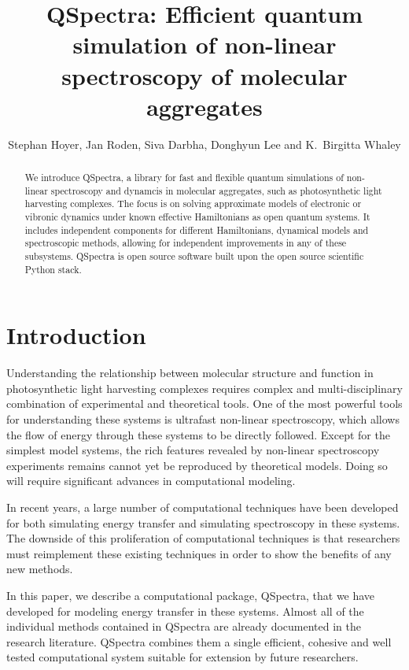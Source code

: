 \documentclass{article}
\begin{document}
\title{QSpectra: Efficient quantum simulation of non-linear spectroscopy of molecular aggregates}
\author{Stephan Hoyer, Jan Roden, Siva Darbha, Donghyun Lee and K.\ Birgitta Whaley}
\maketitle

\begin{abstract}
We introduce QSpectra, a library for fast and flexible quantum simulations of non-linear spectroscopy and dynamcis in molecular aggregates, such as photosynthetic light harvesting complexes.
The focus is on solving approximate models of electronic or vibronic dynamics under known effective Hamiltonians as open quantum systems.
It includes independent components for different Hamiltonians, dynamical models and spectroscopic methods, allowing for independent improvements in any of these subsystems.
QSpectra is open source software built upon the open source scientific Python stack.
\end{abstract}


\section{Introduction}

Understanding the relationship between molecular structure and function in photosynthetic light harvesting complexes requires complex and multi-disciplinary combination of experimental and theoretical tools. One of the most powerful tools for understanding these systems is ultrafast non-linear spectroscopy, which allows the flow of energy through these systems to be directly followed. Except for the simplest model systems, the rich features revealed by non-linear spectroscopy experiments remains cannot yet be reproduced by theoretical models. Doing so will require significant advances in computational modeling.

In recent years, a large number of computational techniques have been developed for both simulating energy transfer and simulating spectroscopy in these systems. The downside of this proliferation of computational techniques is that researchers must reimplement these existing techniques in order to show the benefits of any new methods.

In this paper, we describe a computational package, QSpectra, that we have developed for modeling energy transfer in these systems. Almost all of the individual methods contained in QSpectra are already documented in the research literature. QSpectra combines them a single efficient, cohesive and well tested computational system suitable for extension by future researchers.
\end{document}
